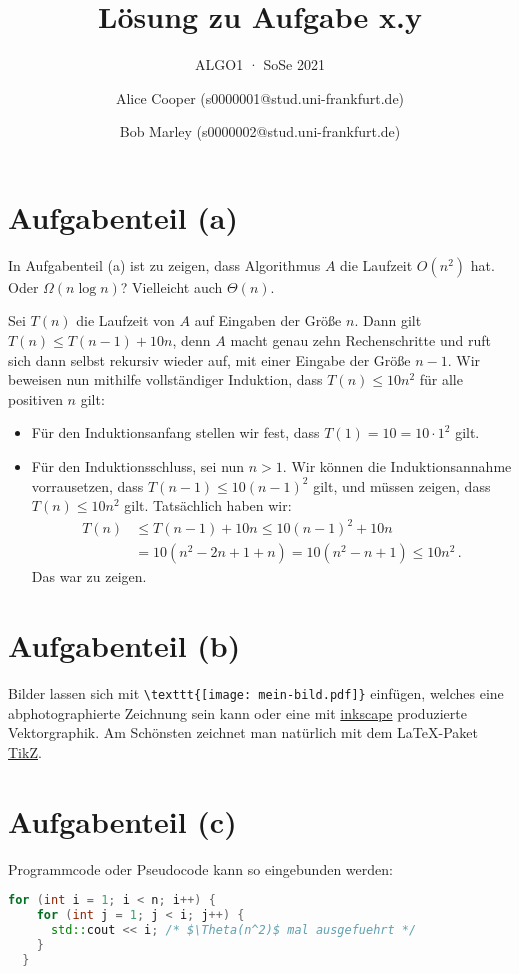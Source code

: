 \documentclass[a4paper,11pt,oneside]{scrartcl}
\subtitle{ALGO1 · SoSe 2021}
\title{Lösung zu Aufgabe x.y}
\author{%
  Alice Cooper (s0000001@stud.uni-frankfurt.de)%
  \and Bob Marley (s0000002@stud.uni-frankfurt.de)%
}
\begin{document}
\maketitle

\section{Aufgabenteil (a)}%

In Aufgabenteil (a) ist zu zeigen, dass Algorithmus $A$ die Laufzeit $O(n^2)$ hat. Oder $\Omega(n\log n)$? Vielleicht auch $\Theta(n)$.

Sei $T(n)$ die Laufzeit von $A$ auf Eingaben der Größe $n$.
Dann gilt $T(n)\le T(n-1) + 10n$, denn $A$ macht genau zehn Rechenschritte und ruft sich dann selbst rekursiv wieder auf, mit einer Eingabe der Größe $n-1$. Wir beweisen nun mithilfe vollständiger Induktion, dass $T(n)\le 10n^2$ für alle positiven $n$ gilt:

\begin{itemize}
  \item Für den Induktionsanfang stellen wir fest, dass $T(1)=10=10 \cdot 1^2$ gilt.
  \item Für den Induktionsschluss, sei nun $n>1$. Wir können die Induktionsannahme vorrausetzen, dass $T(n-1)\le 10 (n-1)^2$ gilt, und müssen zeigen, dass $T(n)\le 10n^2$ gilt. Tatsächlich haben wir:
  \begin{align*}
    T(n) &\le T(n-1)+10n
    \le 10(n-1)^2 + 10n\\
    &= 10 (n^2-2n+1+n)
    = 10 (n^2-n+1) \le 10 n^2\,.
  \end{align*}
  Das war zu zeigen.
\end{itemize}

\section{Aufgabenteil (b)}

Bilder lassen sich mit \verb|\texttt{[image: mein-bild.pdf]}| einfügen, welches eine abphotographierte Zeichnung sein kann oder eine mit \href{https://inkscape.org/}{inkscape} produzierte Vektorgraphik. Am Schönsten zeichnet man natürlich mit dem LaTeX-Paket \href{https://www.overleaf.com/learn/latex/TikZ_package/}{TikZ}.

\section{Aufgabenteil (c)}

Programmcode oder Pseudocode kann so eingebunden werden:
\begin{lstlisting}[language=C++]
  for (int i = 1; i < n; i++) {
    for (int j = 1; j < i; j++) {
      std::cout << i; /* $\Theta(n^2)$ mal ausgefuehrt */
    }
  }
\end{lstlisting}
\end{document}
